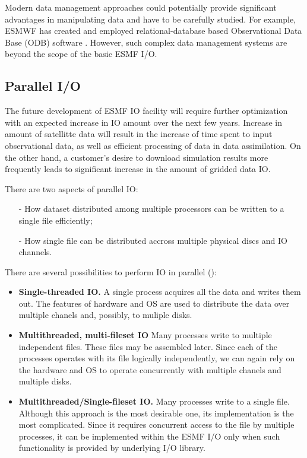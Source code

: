 Modern data management approaches could potentially provide significant 
advantages in manipulating data and have to be carefully studied.
For example, ESMWF has created and employed relational-database based 
Observational Data Base (ODB) software \cite{ODB}.  However, such complex 
data management systems are beyond the scope of the basic ESMF I/O. 


\subsection{Parallel I/O}

The future development of ESMF IO facility will require further
optimization with an expected increase in IO amount over the next few
years. Increase in amount of satellitte data will result in the
increase of time spent to input observational data, as well as
efficient processing of data in data assimilation. On the
other hand, a customer's desire to download simulation results more 
frequently leads to significant increase in the amount of gridded data IO.

There are two aspects of  parallel IO:

\begin{itemize}
\item[-] How dataset distributed among multiple processors can be
written to a single file efficiently;

\item[-] How single file can be distributed accross multiple physical
discs and IO channels.
\end{itemize}
 
There are several possibilities to perform IO in parallel (\cite{MPI-2}):
\begin{itemize}
\item {\bf Single-threaded IO.} A single process acquires all the data and
writes them out. The features of hardware and OS are used to distribute the 
data over multiple chanels and, possibly, to muliple disks.

\item {\bf Multithreaded, multi-fileset IO} Many processes write to
multiple independent files. These files may be assembled later. Since each of 
the processes operates with its file logically independently, we can again 
rely on the hardware and OS to operate concurrently with multiple chanels and 
multiple disks. 
 
\item {\bf Multithreaded/Single-fileset IO.} Many processes write to a
single file. Although this approach is the most desirable one, its 
implementation is the most complicated. Since it requires concurrent access 
to the file by multiple processes, it can be implemented within the ESMF I/O 
only when such functionality is provided by underlying I/O library. 
\end{itemize}

